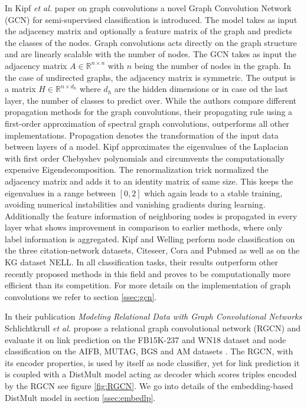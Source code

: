 In Kipf \textit{et al.} paper on graph convolutions \cite{kipf_semi-supervised_2017} a novel Graph Convolution Network (GCN) for semi-supervised classification is introduced. The model takes as input the adjacency matrix and optionally a feature matrix of the graph and predicts the classes of the nodes. Graph convolutions acts directly on the graph structure and are linearly scalable with the number of nodes. The GCN takes as input the adjacency matrix $A \in \mathbb{R}^{n \times n}$ with $n$ being the number of nodes in the graph. In the case of undirected graphs, the adjacency matrix is symmetric. The output is a matrix $H \in \mathbb{R}^{n \times d_h}$ where $d_h$ are the hidden dimensions or in case od the last layer, the number of classes to predict over. 
While the authors compare different propagation methods for the graph convolutions, their propagating rule using a first-order approximation of spectral graph convolutions, outperforms all other implementations. Propagation denotes the transformation of the input data between layers of a model. Kipf approximates the eigenvalues of the Laplacian with first order Chebyshev polynomials and circumvents the computationally expensive Eigendecomposition. The renormalization trick normalized the adjacency matrix and adds it to an identity matrix of same size. This keeps the eigenvalues in a range between $[0,2]$ which again leads to a stable training, avoiding numerical instabilities and vanishing gradients during learning. Additionally the feature information of neighboring nodes is propagated in every layer what shows improvement in comparison to earlier methods, where only label information is aggregated.
Kipf and Welling perform node classification on the three citation-network datasets, Citeseer, Cora and Pubmed as well as on the KG dataset NELL. In all classification tasks, their results outperform other recently proposed methods in this field and proves to be computationally more efficient than its competition. For more details on the implementation of graph convolutions we refer to section \ref{ssec:gcn}. 

In their publication \textit{Modeling Relational Data with Graph Convolutional Networks} Schlichtkrull \textit{et al.} propose a relational graph convolutional network (RGCN) and evaluate it on link prediction on the FB15K-237 and WN18 dataset and node classification on the AIFB, MUTAG, BGS and AM datasets \cite{gangemi_modeling_2018}. The RGCN, with its encoder properties, is used by itself as node classifier, yet for link prediction it is coupled with a DistMult model acting as decoder which scores triples encoded by the RGCN see figure \ref{fig:RGCN}. We go into details of the embedding-based DistMult model in section \ref{ssec:embedlp}.

